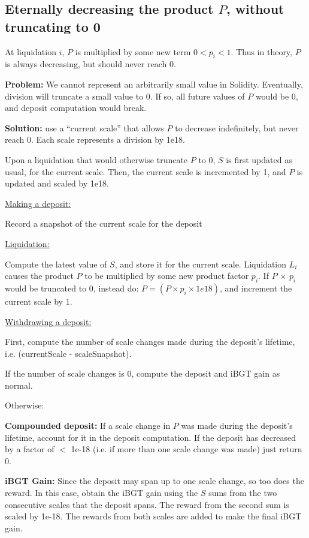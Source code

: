 \documentclass[reqno]{article}
\begin{document}
\bigskip
\subsection{Eternally decreasing the product $P$, without truncating to 0}

\bigskip
At liquidation $i$, $P$ is multiplied by some new term $0 < p_i <1$. Thus in theory, $P$ is always decreasing, but should never reach 0. 

\bigskip
\textbf{Problem:} We cannot represent an arbitrarily small value in Solidity.  Eventually, division will truncate a small value to 0. If so, all future values of $P$ would be 0, and deposit computation would break.

\bigskip
\textbf{Solution:} use a “current scale” that allows $P$ to decrease indefinitely, but never reach 0. Each scale represents a division by 1e18.  

\bigskip
Upon a liquidation that would otherwise truncate $P$ to 0, $S$ is first updated as usual, for the current scale. Then, the current scale is incremented by 1, and $P$ is updated and scaled by 1e18.

\bigskip
\underline{Making a deposit:}

Record a snapshot of the current scale for the deposit

\bigskip
\underline{Liquidation:}

Compute the latest value of $S$, and store it for the current scale.
Liquidation $L_i$ causes the product $P$ to be multiplied by some new product factor $p_i$.  If $P$ $\times$ $p_i$ would be truncated to 0, instead do: $P = (P \times p_i \times 1e18)$, and increment the current scale by 1.

\bigskip
\underline{Withdrawing a deposit:}

First, compute the number of scale changes made during the deposit’s lifetime, i.e. (currentScale - scaleSnapshot).

\bigskip
If the number of scale changes is 0, compute the deposit and iBGT gain as normal.

\bigskip
Otherwise:

\bigskip
\textbf{Compounded deposit:} If a scale change in $P$ was made during the deposit's lifetime, account for it in the deposit computation. If the deposit has decreased by a factor of $<$ 1e-18 (i.e. if more than one scale change was made) just return 0.

\bigskip
\textbf{iBGT Gain:} Since the deposit may span up to one scale change, so too does the reward. In this case, obtain the iBGT gain using the $S$ sums from the two consecutive scales that the deposit spans. The reward from the second sum is scaled by 1e-18. The rewards from both scales are added to make the final iBGT gain.
\end{document}

